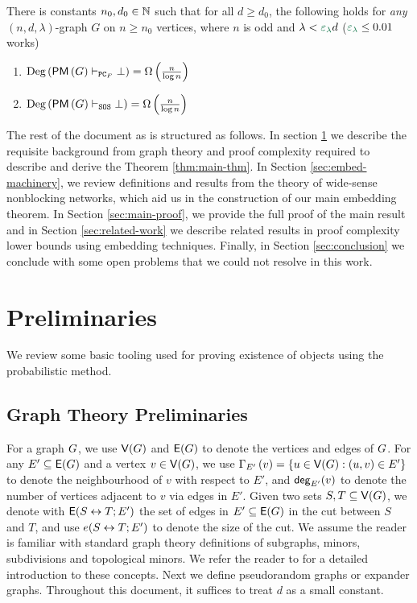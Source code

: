 \documentclass[11pt]{article}
\begin{document}
\begin{theorem}\label{thm:main-thm}

There is constants $n_0, d_0 \in \mathbb{N}$ such that for all $d \geq d_0$, the following holds  for \emph{any} $(n, d, \lambda)$-graph $G$ on $n \geq n_0$ vertices, where $n$ is odd and $\lambda < \epsilonL d$ ($\epsilonL \leq 0.01$ works) 
\begin{enumerate}
    \item{ $\text{Deg}\left(\mathsf{PM}\left(G\right) \vdash_{\texttt{PC}_F} \bot\right) = \Omega\left(\frac{n}{\log n}\right)$} 
    \item{$\text{Deg}\left(\mathsf{PM}\left(G\right) \vdash_{\texttt{SOS}} \bot\right) = \Omega\left(\frac{n}{\log n}\right)$}
\end{enumerate}

\end{theorem}

The rest of the document as is structured as follows. In section \ref{sec:prelims} we describe the requisite background from graph theory and proof complexity required to describe and derive the Theorem \ref{thm:main-thm}.
In Section \ref{sec:embed-machinery}, we review definitions and results from the theory of wide-sense nonblocking networks, which aid us in the construction of our main embedding theorem.
In Section \ref{sec:main-proof}, we provide the full proof of the main result and in Section \ref{sec:related-work} we describe related results in proof complexity lower bounds using embedding techniques.
Finally, in Section \ref{sec:conclusion} we conclude with some open problems that we could not resolve in this work.


\section{Preliminaries}
\label{sec:prelims}

We review some basic tooling used for proving existence of objects using the probabilistic method.




\subsection{Graph Theory Preliminaries}
\label{sec:graph-theory-prelims}

For a graph $G$, we use $\mathsf{V}(G)$ and $\mathsf{E}(G)$ to denote the vertices and edges of $G$. 
For any $E' \subseteq \mathsf{E}(G)$ and a vertex $v \in \mathsf{V}(G)$, we use $\Gamma_{E'}\left(v\right) = \{ u \in \mathsf{V}(G) : (u,v) \in E' \}$ to denote the neighbourhood of $v$ with respect to $E'$, and $\mathsf{deg}_{E'}(v)$ to denote the number of vertices adjacent to $v$ via edges in $E'$.
Given two sets $S, T \subseteq \mathsf{V}(G)$, we denote with $\mathsf{E}(S \leftrightarrow T; E')$ the set of edges in $E' \subseteq \mathsf{E}(G)$ in the cut between $S$ and $T$, and use $e(S \leftrightarrow T; E')$ to denote the size of the cut.
We assume the reader is familiar with standard graph theory definitions of subgraphs, minors, subdivisions and  topological minors.
We refer the reader to \citep{bollobas2012graph} for a detailed introduction to these concepts.
Next we define pseudorandom graphs or expander graphs. 
Throughout this document, it suffices to treat $d$ as a small constant.
\end{document}

